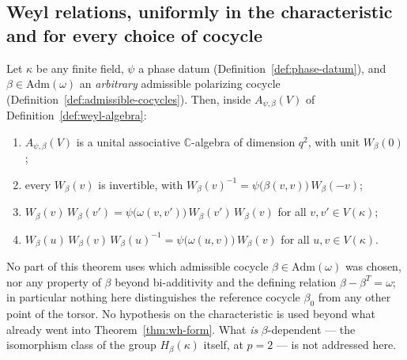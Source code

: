 \subsection{Weyl relations, uniformly in the characteristic and for every
choice of cocycle}

\statusProved
\begin{theorem}
\label{thm:wh-comm}
Let $\kappa$ be any finite field, $\psi$ a phase datum
(Definition~\ref{def:phase-datum}), and $\beta \in \mathrm{Adm}(\omega)$ an
\emph{arbitrary} admissible polarizing cocycle
(Definition~\ref{def:admissible-cocycles}). Then, inside $A_{\psi,\beta}(V)$
of Definition~\ref{def:weyl-algebra}:
\begin{enumerate}[label=(\alph*)]
\item $A_{\psi,\beta}(V)$ is a unital associative $\mathbb{C}$-algebra of
dimension $q^2$, with unit $W_\beta(0)$;
\item every $W_\beta(v)$ is invertible, with
$W_\beta(v)^{-1} = \psi\big(\beta(v,v)\big)\, W_\beta(-v)$;
\item $W_\beta(v)\,W_\beta(v') = \psi\big(\omega(v,v')\big)\, W_\beta(v')\,W_\beta(v)$
for all $v,v'\in V(\kappa)$;
\item $W_\beta(u)\,W_\beta(v)\,W_\beta(u)^{-1} = \psi\big(\omega(u,v)\big)\,W_\beta(v)$
for all $u,v\in V(\kappa)$.
\end{enumerate}
\end{theorem}

\begin{scope}
No part of this theorem uses which admissible cocycle $\beta\in\mathrm{Adm}(\omega)$
was chosen, nor any property of $\beta$ beyond bi-additivity and the defining
relation $\beta-\beta^T=\omega$; in particular nothing here distinguishes the
reference cocycle $\beta_0$ from any other point of the torsor. No hypothesis
on the characteristic is used beyond what already went into
Theorem~\ref{thm:wh-form}. What \emph{is} $\beta$-dependent — the
isomorphism class of the group $H_\beta(\kappa)$ itself, at $p=2$ — is not
addressed here.
\end{scope}


